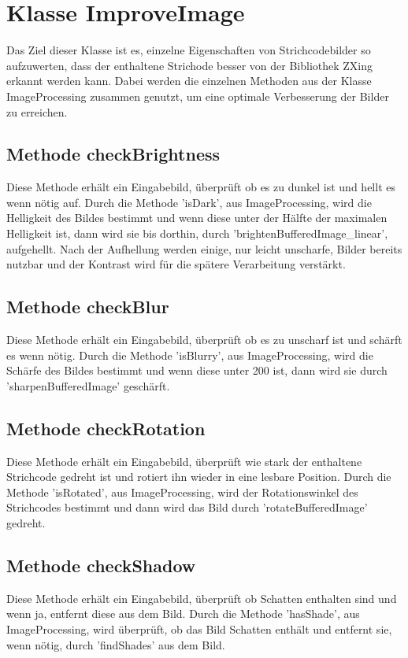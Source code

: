 \section{Klasse ImproveImage}
\writtenby{\dcauthornameriren}%
Das Ziel dieser Klasse ist es, einzelne Eigenschaften von Strichcodebilder so aufzuwerten, dass der enthaltene Strichode besser von der Bibliothek ZXing erkannt werden kann.
Dabei werden die einzelnen Methoden aus der Klasse ImageProcessing zusammen genutzt, um eine optimale Verbesserung der Bilder zu erreichen.


\subsection*{Methode checkBrightness}
Diese Methode erhält ein Eingabebild, überprüft ob es zu dunkel ist und hellt es wenn nötig auf.
Durch die Methode 'isDark', aus ImageProcessing, wird die Helligkeit des Bildes bestimmt und wenn diese unter der Hälfte der maximalen Helligkeit ist, dann wird sie bis dorthin, durch 'brightenBufferedImage\_linear', aufgehellt.
Nach der Aufhellung werden einige, nur leicht unscharfe, Bilder bereits nutzbar und der Kontrast wird für die spätere Verarbeitung verstärkt.


\subsection*{Methode checkBlur}
Diese Methode erhält ein Eingabebild, überprüft ob es zu unscharf ist und schärft es wenn nötig.
Durch die Methode 'isBlurry', aus ImageProcessing, wird die Schärfe des Bildes bestimmt und wenn diese unter 200 ist, dann wird sie durch 'sharpenBufferedImage' geschärft.


\subsection*{Methode checkRotation}
Diese Methode erhält ein Eingabebild, überprüft wie stark der enthaltene Strichcode gedreht ist und rotiert ihn wieder in eine lesbare Position.
Durch die Methode 'isRotated', aus ImageProcessing, wird der Rotationswinkel des Strichcodes bestimmt und dann wird das Bild durch 'rotateBufferedImage' gedreht.


\subsection*{Methode checkShadow}
Diese Methode erhält ein Eingabebild, überprüft ob Schatten enthalten sind und wenn ja, entfernt diese aus dem Bild.
Durch die Methode 'hasShade', aus ImageProcessing, wird überprüft, ob das Bild Schatten enthält und entfernt sie, wenn nötig, durch 'findShades' aus dem Bild.
 

